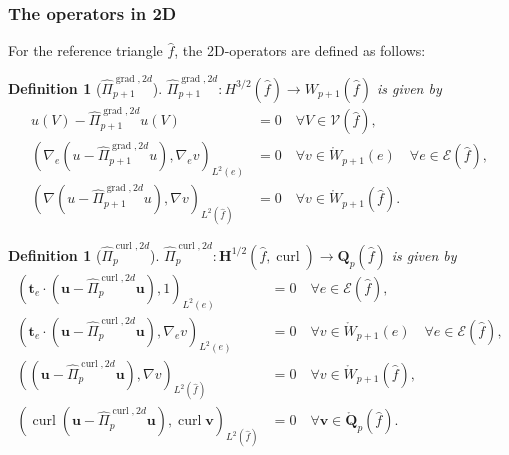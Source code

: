 \documentclass{article}
\newtheorem{definition}[theorem]{Definition}
\newcommand{\hatPicurlcomtwod}{\widehat \Pi^{\operatorname*{curl},2d}_p}
\newcommand{\hatPigradcomtwod}{\widehat\Pi^{\operatorname*{grad},2d}_{p+1}}
\begin{document}
\subsubsection{The operators in 2D}
For the reference triangle $\widehat f$, the 2D-operators are defined 
as follows: 
\begin{definition}[$\hatPigradcomtwod$]
$\hatPigradcomtwod:H^{3/2}(\widehat{f}) \rightarrow W_{p+1}(\widehat{f})$ is given by
\begin{subequations}
\label{eq:Pi_grad-2d}
\begin{align}
u(V)-\hatPigradcomtwod u(V)  &  =0\quad\forall
V\in{\mathcal{V}}(\widehat{f}), 
\label{eq:Pi_grad-2d-c}\\
(\nabla_{e}(u-\hatPigradcomtwod u),\nabla
_{e}v)_{L^{2}(e)}  &  =0\quad\forall v\in\mathring{W}_{p+1}(e)\quad\forall
e\in{\mathcal{E}}(\widehat{f}),
\label{eq:Pi_grad-2d-b}\\
(\nabla(u-\hatPigradcomtwod u),\nabla v)_{L^{2}%
(\widehat{f})}  &  =0\quad\forall v\in\mathring{W}_{p+1}(\widehat{f}).
\label{eq:Pi_grad-2d-a}
\end{align}
\end{subequations}
\end{definition}

\begin{definition}[$\hatPicurlcomtwod$]
$\hatPicurlcomtwod:\mathbf{H}^{1/2}(\widehat{f},\operatorname*{curl}) \rightarrow \mathbf{Q}_p(\widehat{f})$ is given by
\begin{subequations}
\label{eq:Pi_curl-2d}
\begin{align}
({\mathbf{t}}_{e}\cdot(\mathbf{u}-\hatPicurlcomtwod\mathbf{u}),1)_{L^{2}(e)}  &  =0\quad\forall e\in{\mathcal{E}}%
(\widehat{f}), 
\label{eq:Pi_curl-2d-d}\\
(\mathbf{t}_{e}\cdot(\mathbf{u}-\hatPicurlcomtwod\mathbf{u}),\nabla_{e}v)_{L^{2}(e)}  &  =0\quad\forall v\in\mathring
{W}_{p+1}(e)\quad\forall e\in{\mathcal{E}}(\widehat{f}),
\label{eq:Pi_curl-2d-c}\\
((\mathbf{u}-\hatPicurlcomtwod\mathbf{u}),\nabla
v)_{L^{2}(\widehat{f})}  &  =0\quad\forall v\in\mathring{W}_{p+1}(\widehat{f}),
\label{eq:Pi_curl-2d-b}\\
(\operatorname*{curl}(\mathbf{u}-\hatPicurlcomtwod\mathbf{u}),\operatorname*{curl}\mathbf{v})_{L^{2}(\widehat{f})}  &  =0\quad
\forall\mathbf{v}\in\mathring{\mathbf{Q}}_{p}(\widehat{f}).
\label{eq:Pi_curl-2d-a}
\end{align}
\end{subequations}
\end{definition}
\end{document}
